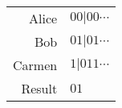 \begin{tabular}{r|l}
     Alice & $00|00 \cdots $ \\
     Bob & $01|01 \cdots $ \\
     Carmen & $1|011 \cdots$ \\\hline
     Result & $01$\\
\end{tabular}